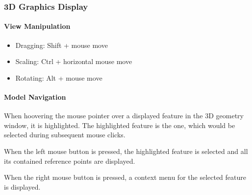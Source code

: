 \subsubsection{3D Graphics Display}

\paragraph{View Manipulation}

\begin{itemize}
\item Dragging: Shift + mouse move
\item Scaling: Ctrl + horizontal mouse move
\item Rotating: Alt + mouse move
\end{itemize}


\paragraph{Model Navigation}

When hoovering the mouse pointer over a displayed feature in the 3D
geometry window, it is highlighted. The highlighted feature is the one,
which would be selected during subsequent mouse clicks.

When the left mouse button is pressed, the highlighted feature is
selected and all its contained reference points are displayed.

When the right mouse button is pressed, a context menu for the selected
feature is displayed.

